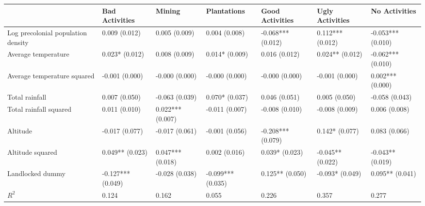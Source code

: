 \begin{tabular}{lllllll}
\toprule
 & Bad Activities & Mining & Plantations & Good Activities & Ugly Activities & No Activities \\
\midrule
Log precolonial population density & 0.009
(0.012) & 0.005
(0.009) & 0.004
(0.008) & -0.068***
(0.012) & 0.112***
(0.012) & -0.053***
(0.010) \\
Average temperature & 0.023*
(0.012) & 0.008
(0.009) & 0.014*
(0.009) & 0.016
(0.012) & 0.024**
(0.012) & -0.062***
(0.010) \\
Average temperature squared & -0.001
(0.000) & -0.000
(0.000) & -0.000
(0.000) & -0.000
(0.000) & -0.001
(0.000) & 0.002***
(0.000) \\
Total rainfall & 0.007
(0.050) & -0.063
(0.039) & 0.070*
(0.037) & 0.046
(0.051) & 0.005
(0.050) & -0.058
(0.043) \\
Total rainfall squared & 0.011
(0.010) & 0.022***
(0.007) & -0.011
(0.007) & -0.008
(0.010) & -0.008
(0.009) & 0.006
(0.008) \\
Altitude & -0.017
(0.077) & -0.017
(0.061) & -0.001
(0.056) & -0.208***
(0.079) & 0.142*
(0.077) & 0.083
(0.066) \\
Altitude squared & 0.049**
(0.023) & 0.047***
(0.018) & 0.002
(0.016) & 0.039*
(0.023) & -0.045**
(0.022) & -0.043**
(0.019) \\
Landlocked dummy & -0.127***
(0.049) & -0.028
(0.038) & -0.099***
(0.035) & 0.125**
(0.050) & -0.093*
(0.049) & 0.095**
(0.041) \\
$R^2$ & 0.124 & 0.162 & 0.055 & 0.226 & 0.357 & 0.277 \\
\bottomrule
\end{tabular}
